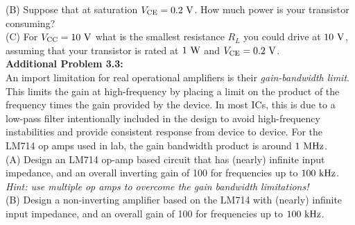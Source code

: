 \documentclass[12pt]{article}
\begin{document}
\noindent
(B) Suppose that at saturation $V_{\rm CE} = 0.2~\rm V$.  How much power is your transistor consuming? \\

\noindent
(C) For $V_{\rm CC}=10~\rm V$ what is the smallest resistance $R_L$ you could drive at $10~\rm V$, assuming that your transistor is rated at $1~\rm W$ and $V_{\rm CE} = 0.2~\rm V$.\\

\noindent
{\bf Additional Problem 3.3:}  \\
An import limitation for real operational amplifiers is their {\em gain-bandwidth limit}.  This limits the gain at high-frequency by placing a limit on the product of the frequency times the gain provided by the device.   In most ICs, this is due to a low-pass filter intentionally included in the design to avoid high-frequency instabilities and provide consistent response from device to device.  For the LM714 op amps used in lab, the gain bandwidth product is around $1~\rm MHz$.\\

\noindent
(A)  Design an LM714 op-amp based circuit that has (nearly) infinite input impedance, and an overall inverting gain of 100 for frequencies up to $100~\rm kHz$.   {\em Hint:  use multiple op amps to overcome the gain bandwidth limitations!} \\

\noindent
(B) Design a non-inverting amplifier based on the LM714 with (nearly) infinite input impedance, and an overall gain of 100 for frequencies up to $100~\rm kHz$.
\end{document}
